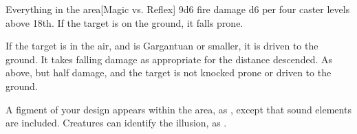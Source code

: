 \spellrng{\rnglong}
\begin{spelltargets}{Everything in the area}[Magic vs. Reflex]
    \spellsuccess 9d6 fire damage \add d6 per four caster levels above 18th. If the target is on the ground, it falls prone.
    
    If the target is in the air, and is Gargantuan or smaller, it is driven to the ground. It takes falling damage as appropriate for the distance descended.
    \spellfailure As above, but half damage, and the target is not knocked prone or driven to the ground.
\end{spelltargets}
\spellnotes \firespellnotes

\destructivespellnotes

\spelldur{\durshort}
\spellline
\spelleffect A figment of your design appears within the area, as , except that sound elements are included.
\spellnotes Creatures can identify the illusion, as .

